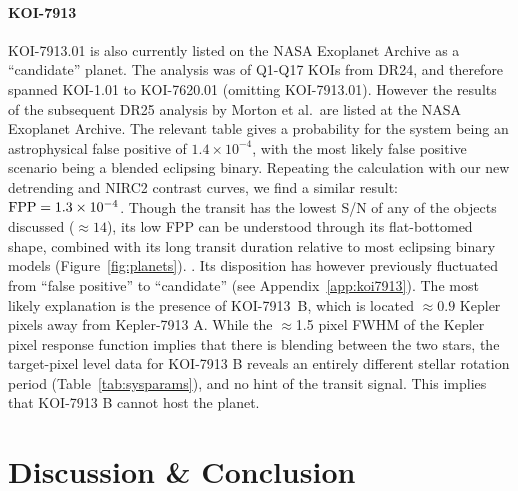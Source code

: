 \documentclass[12pt,twocolumn,tighten,linenumbers,trackchanges]{aastex63}
\begin{document}
\paragraph{KOI-7913}
KOI-7913.01 is also currently listed on the NASA Exoplanet Archive as a
``candidate'' planet.  The \citet{morton_false_2016}
analysis was of Q1-Q17 KOIs from DR24, and therefore spanned KOI-1.01
to KOI-7620.01 (omitting KOI-7913.01).  However the results of the
subsequent DR25 analysis by Morton et al.\ are listed at the NASA
Exoplanet Archive.  The relevant table gives a probability for the
system being an astrophysical false positive of $1.4\times10^{-4}$,
with the most likely false positive scenario being a blended eclipsing
binary.  Repeating the calculation with our new detrending and
NIRC2 contrast curves, we find a similar result: ${\rm FPP} =
1.3\times10^{-4}$.  Though the transit has the lowest S/N of any of
the objects discussed ($\approx$$14$), its low FPP  can be understood through its flat-bottomed shape,
combined with its long transit duration relative to most
eclipsing binary models (Figure~\ref{fig:planets}).  .  Its
disposition has however previously fluctuated from ``false positive''
to ``candidate'' (see Appendix~\ref{app:koi7913}).  The most likely
explanation is the presence of KOI-7913~B, which is located
$\approx0.9$ Kepler pixels away from Kepler-7913 A.  
While the $\approx$1.5 pixel FWHM of the Kepler pixel response function
implies that there is blending between the two stars,
the target-pixel level data for KOI-7913 B reveals an
entirely different stellar rotation
period (Table~\ref{tab:sysparams}), and no hint of the transit signal.
This implies that KOI-7913 B cannot host the planet.


\section{Discussion \& Conclusion}
\label{sec:disc_conc}
\end{document}
